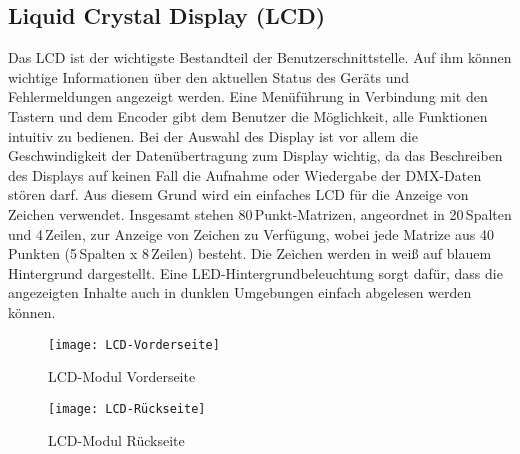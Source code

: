 
\subsection{Liquid Crystal Display (LCD)}
\label{sec:HardLCD}
Das LCD ist der wichtigste Bestandteil der Benutzerschnittstelle. Auf ihm können wichtige Informationen über den aktuellen Status des Geräts und Fehlermeldungen angezeigt werden. Eine Menüführung in Verbindung mit den Tastern und dem Encoder gibt dem Benutzer die Möglichkeit, alle Funktionen intuitiv zu bedienen. Bei der Auswahl des Display ist vor allem die Geschwindigkeit der Datenübertragung zum Display wichtig, da das Beschreiben des Displays auf keinen Fall die Aufnahme oder Wiedergabe der DMX-Daten stören darf. Aus diesem Grund wird ein einfaches LCD für die Anzeige von Zeichen verwendet. Insgesamt stehen 80\,Punkt-Matrizen, angeordnet in 20\,Spalten und 4\,Zeilen, zur Anzeige von Zeichen zu Verfügung, wobei jede Matrize aus 40\,Punkten (5\,Spalten x 8\,Zeilen) besteht. Die Zeichen werden in weiß auf blauem Hintergrund dargestellt. Eine LED-Hintergrundbeleuchtung sorgt dafür, dass die angezeigten Inhalte auch in dunklen Umgebungen einfach abgelesen werden können.
\begin{figure}[h]
	\begin{minipage}{.45\linewidth}
		\centering
		\texttt{[image: LCD-Vorderseite]}
		\caption{LCD-Modul Vorderseite}
		\label{fig:LCD-front}
	\end{minipage}
	\hfill
	\begin{minipage}{.45\linewidth}
		\centering
		\texttt{[image: LCD-Rückseite]}
		\caption{LCD-Modul Rückseite}
		\label{fig:LCD-back}
	\end{minipage}
\end{figure}
